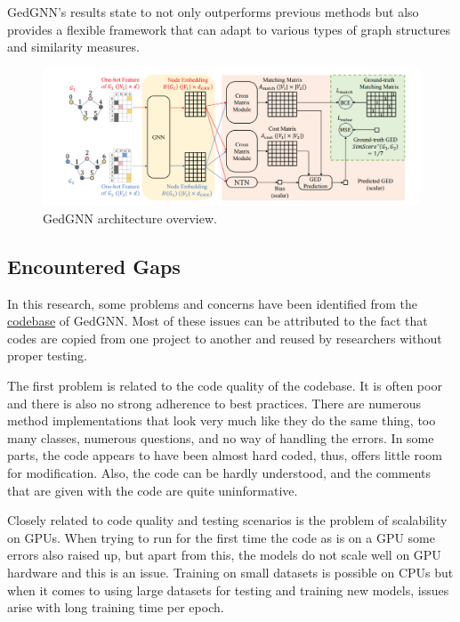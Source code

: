 \documentclass[../Thesis.tex]{subfiles}
\begin{document}
	GedGNN's results state to not only outperforms previous methods but also provides a flexible framework that can adapt to various types of graph structures and similarity measures.
	
	\begin{figure}[H]
		\centering
		\includegraphics[width=\textwidth]{Images/gedgnn_architecture.png}
		\caption{GedGNN architecture overview.}
		\label{fig:gedgnn_architecture}
	\end{figure}
	
	\subsection{Encountered Gaps}
	
	In this research, some problems and concerns have been identified from the \href{https://github.com/ChengzhiPiao/GEDGNN}{codebase} of GedGNN. Most of these issues can be attributed to the fact that codes are copied from one project to another and reused by researchers without proper testing.
	
	The first problem is related to the code quality of the codebase. It is often poor and there is also no strong adherence to best practices. There are numerous method implementations that look very much like they do the same thing, too many classes, numerous questions, and no way of handling the errors. In some parts, the code appears to have been almost hard coded, thus, offers little room for modification. Also, the code can be hardly understood, and the comments that are given with the code are quite uninformative.
	
	Closely related to code quality and testing scenarios is the problem of scalability on GPUs. When trying to run for the first time the code as is on a GPU some errors also raised up, but apart from this, the models do not scale well on GPU hardware and this is an issue. Training on small datasets is possible on CPUs but when it comes to using large datasets for testing and training new models, issues arise with long training time per epoch.
	
\end{document}
